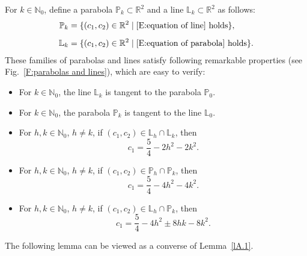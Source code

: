 \documentclass[reqno,11pt,centertags]{amsart}
\newcommand{\bbN}{{\mathbb{N}}}
\newcommand{\bbR}{{\mathbb{R}}}
\newcommand{\<}{\langle}
\renewcommand{\>}{\rangle}
\numberwithin{equation}{section}
\theoremstyle{definition}
\begin{document}
For $k\in \bbN_0$, define a parabola $\mathbb{P}_k \subset \bbR^2$ and a line $\mathbb{L}_k \subset \bbR^2$ as follows:
\begin{align}
\mathbb{P}_k&=\{(c_1,c_2)\in \bbR^2 \mid \mbox{\eqref{E:equation of line} holds}\},\\[5pt]
\mathbb{L}_k&=\{(c_1,c_2)\in \bbR^2 \mid \mbox{\eqref{E:equation of parabola} holds}\}.
\end{align} 
These families of parabolas and lines satisfy following remarkable properties (see Fig.~\ref{F:parabolas and lines}), which are easy to verify:

\begin{itemize}
\item For $k\in \bbN_0$, the line  $\mathbb{L}_k$ is tangent to the parabola $\mathbb{P}_0$.\\[-5pt]
\item For $k\in \bbN_0$, the  parabola $\mathbb{P}_k$ is tangent to the  line  $\mathbb{L}_0$.\\[-5pt]
\item For $h,k\in \bbN_0$, $h\not= k$, if  $(c_1,c_2)\in \mathbb{L}_{h}\cap \mathbb{L}_{k}$, then
\begin{equation}
c_1=\frac{5}{4}- 2 h^2 - 2k^2.
\end{equation}
\item For $h,k\in \bbN_0$, $h\not= k$, if  $(c_1,c_2)\in \mathbb{P}_{h}\cap \mathbb{P}_{k}$, then 
\begin{equation}
c_1=\frac{5}{4}- 4 h^2 - 4 k^2.
\end{equation}
\item For $h,k\in \bbN_0$, $h\not= k$, if  $(c_1,c_2)\in \mathbb{L}_{h}\cap \mathbb{P}_{k}$, then 
\begin{equation}
c_1=\frac{5}{4} - 4 h^2\pm  8 h k - 8 k^2.
\end{equation}
\end{itemize}

The following lemma can be viewed as a converse of Lemma~\ref{lA.1}.
\end{document}
